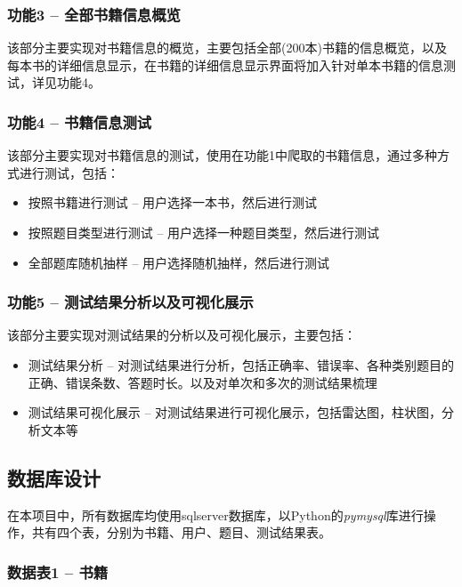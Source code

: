 \documentclass[twoside,11pt]{article}
\begin{document}
\subsubsection{功能3 -- 全部书籍信息概览}
该部分主要实现对书籍信息的概览，主要包括全部(200本)书籍的信息概览，以及每本书的详细信息显示，在书籍的详细信息显示界面将加入针对单本书籍的信息测试，详见功能4。


\vspace{0.5cm}

\subsubsection{功能4 -- 书籍信息测试}
该部分主要实现对书籍信息的测试，使用在功能1中爬取的书籍信息，通过多种方式进行测试，包括：
\begin{itemize}
    \item 按照书籍进行测试 -- 用户选择一本书，然后进行测试
    \item 按照题目类型进行测试 -- 用户选择一种题目类型，然后进行测试
    \item 全部题库随机抽样 -- 用户选择随机抽样，然后进行测试
\end{itemize}

\vspace{0.5cm}

\subsubsection{功能5 -- 测试结果分析以及可视化展示}
该部分主要实现对测试结果的分析以及可视化展示，主要包括：
\begin{itemize}
    \item 测试结果分析 -- 对测试结果进行分析，包括正确率、错误率、各种类别题目的正确、错误条数、答题时长。以及对单次和多次的测试结果梳理
    \item 测试结果可视化展示 -- 对测试结果进行可视化展示，包括雷达图，柱状图，分析文本等
\end{itemize}
\subsection{数据库设计}

在本项目中，所有数据库均使用sqlserver数据库，以Python的\emph{pymysql}库进行操作，共有四个表，分别为书籍、用户、题目、测试结果表。
\subsubsection{数据表1 -- 书籍}
\end{document}
